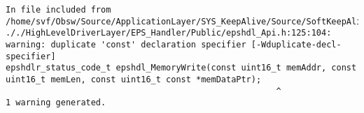 
\noindent\begin{minipage}{\textwidth}
\begin{lstlisting}[language={}, caption=1st warning example., label=srciror_1]
In file included from /home/svf/Obsw/Source/ApplicationLayer/SYS_KeepAlive/Source/SoftKeepAliveTask.c:50: 
././HighLevelDriverLayer/EPS_Handler/Public/epshdl_Api.h:125:104: 
warning: duplicate 'const' declaration specifier [-Wduplicate-decl-specifier]
epshdlr_status_code_t epshdl_MemoryWrite(const uint16_t memAddr, const uint16_t memLen, const uint16_t const *memDataPtr);
													  ^
1 warning generated.
\end{lstlisting}
\end{minipage}